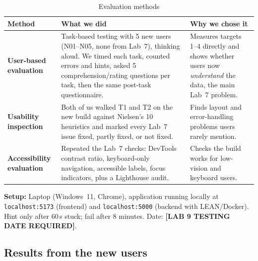 \documentclass[10pt,a4paper]{article}
\begin{document}
\begin{table}[H]
\centering
\caption{Evaluation methods}
\label{tab:methods}
\begin{tabularx}{\textwidth}{l X X}
\toprule
\textbf{Method} & \textbf{What we did} & \textbf{Why we chose it} \\
\midrule
\textbf{User-based evaluation} &
  Task-based testing with 5 new users (N01--N05, none from Lab~7), thinking aloud.
  We timed each task, counted errors and hints, asked 5 comprehension/rating questions per task, then the same post-task questionnaire. &
  Measures targets 1--4 directly and shows whether users now \emph{understand} the data, the main Lab~7 problem. \\[6pt]
\textbf{Usability inspection} &
  Both of us walked T1 and T2 on the new build against Nielsen's 10 heuristics and marked every Lab~7 issue fixed, partly fixed, or not fixed. &
  Finds layout and error-handling problems users rarely mention. \\[6pt]
\textbf{Accessibility evaluation} &
  Repeated the Lab~7 checks: DevTools contrast ratio, keyboard-only navigation, accessible labels, focus indicators, plus a Lighthouse audit. &
  Checks the build works for low-vision and keyboard users. \\
\bottomrule
\end{tabularx}
\end{table}

\textbf{Setup:} Laptop (Windows~11, Chrome), application running locally at \texttt{localhost:5173} (frontend) and \texttt{localhost:5000} (backend with LEAN/Docker). Hint only after 60\,s stuck; fail after 8 minutes. Date: \textbf{[LAB 9 TESTING DATE REQUIRED]}.

\subsection{Results from the new users}
\end{document}
